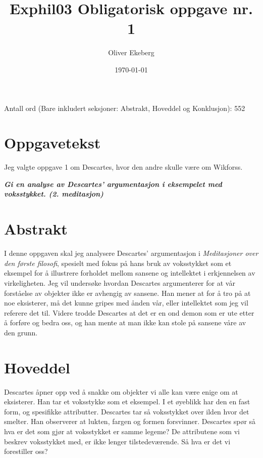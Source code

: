 \documentclass[11pt, a4paper]{article}
\title{Exphil03 Obligatorisk oppgave nr. 1}
\author{Oliver Ekeberg}
\date{\today}
\begin{document}
\maketitle

Antall ord (Bare inkludert seksjoner: Abstrakt, Hoveddel og Konklusjon): 552



\section{Oppgavetekst}

Jeg valgte oppgave 1 om Descartes, hvor den andre skulle være om Wikforss.

\textbf{\textit{Gi en analyse av Descartes’ argumentasjon i eksempelet med voksstykket. (2. meditasjon)
}}



\section{Abstrakt}



I denne oppgaven skal jeg analysere Descartes' argumentasjon i \textit{Meditasjoner over den første filosofi}, spesielt med fokus på hans bruk av voksstykket som et eksempel for å illustrere forholdet mellom sansene og intellektet i erkjennelsen av virkeligheten. Jeg vil undersøke hvordan Descartes argumenterer for at vår forståelse av objekter ikke er avhengig av sansene. Han mener at for å tro på at noe eksisterer, må det kunne gripes med ånden vår, eller intellektet som jeg vil referere det til. Videre trodde Descartes at det er en ond demon som er ute etter å forføre og bedra oss, og han mente at man ikke kan stole på sansene våre av den grunn.


\section{Hoveddel}


Descartes åpner opp ved å snakke om objekter vi alle kan være enige om at eksisterer. Han tar et voksstykke som et eksempel. I et øyeblikk har den en fast form, og spesifikke attributter. Descartes tar så voksstykket over ilden hvor det smelter. Han observerer at lukten, fargen og formen forsvinner. Descartes spør så hva er det som gjør at voksstykket er samme legeme? De attributene som vi beskrev voksstykket med, er ikke lenger tilstedeværende. Så hva er det vi forestiller oss? 
\end{document}
